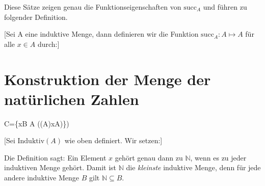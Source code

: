 \documentclass[main.tex]{subfiles}
\begin{document}
\begin{remark}
Diese Sätze zeigen genau die Funktionseigenschaften von \(\mathrm{succ}_A\)  und führen zu folgender Definition.
\end{remark}

[Sei A eine induktive Menge, dann definieren wir die Funktion \(\mathrm{succ}_A:A\mapsto A\)  für alle \(x\in A\) durch:]

\section{Konstruktion der Menge der natürlichen Zahlen}

\begin{tabproofwide}
    {}

    {}
  \proofstepwide{}{}%
    {C=\{x\in B \mid \forall A ((A)\rightarrow x\in A)\})}%
    {}
\end{tabproofwide}


[Sei \(\mathrm{Induktiv}(A)\) wie oben definiert.  Wir setzen:]

\begin{remark}
  Die Definition sagt: Ein Element \(x\) gehört genau dann zu \(\mathbb{N}\), wenn es zu jeder induktiven Menge gehört.  Damit ist \(\mathbb{N}\) die \emph{kleinste} induktive Menge, denn für jede andere induktive Menge \(B\) gilt \(\mathbb{N} \subseteq B\).
\end{remark}

\begin{tabproofwide}
\end{tabproofwide}
\end{document}
